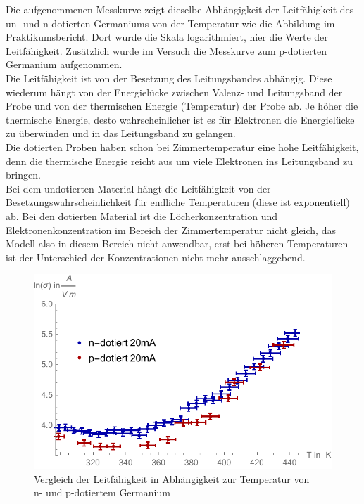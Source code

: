 Die aufgenommenen Messkurve zeigt dieselbe Abhängigkeit der Leitfähigkeit des un- und n-dotierten Germaniums von der Temperatur wie die Abbildung im Praktikumsbericht. Dort wurde die Skala logarithmiert, hier die Werte der Leitfähigkeit. Zusätzlich wurde im Versuch die Messkurve zum p-dotierten Germanium aufgenommen.\\
Die Leitfähigkeit ist von der Besetzung des Leitungsbandes abhängig. Diese wiederum hängt von der Energielücke zwischen Valenz- und Leitungsband der Probe und von der thermischen Energie (Temperatur) der Probe ab. Je höher die thermische Energie, desto wahrscheinlicher ist es für Elektronen die Energielücke zu überwinden und in das Leitungsband zu gelangen.\\
Die dotierten Proben haben schon bei Zimmertemperatur eine hohe Leitfähigkeit, denn die thermische Energie reicht aus um viele Elektronen ins Leitungsband zu bringen.\\ 
Bei dem undotierten Material hängt die Leitfähigkeit von der Besetzungswahrscheinlichkeit für endliche Temperaturen (diese ist exponentiell) ab. Bei den dotierten Material ist die Löcherkonzentration und Elektronenkonzentration im Bereich der Zimmertemperatur nicht gleich, das Modell also in diesem Bereich nicht anwendbar, erst bei höheren Temperaturen ist der Unterschied der Konzentrationen nicht mehr ausschlaggebend. \\

\begin{figure}[H]
	\centering
\includegraphics[width=0.9\linewidth]{IMAGE/M2_npVergleich.pdf}
	\caption{Vergleich der Leitfähigkeit in Abhängigkeit zur Temperatur von\\ n- und p-dotiertem Germanium}
	\label{fig:M2_3}
\end{figure} 

